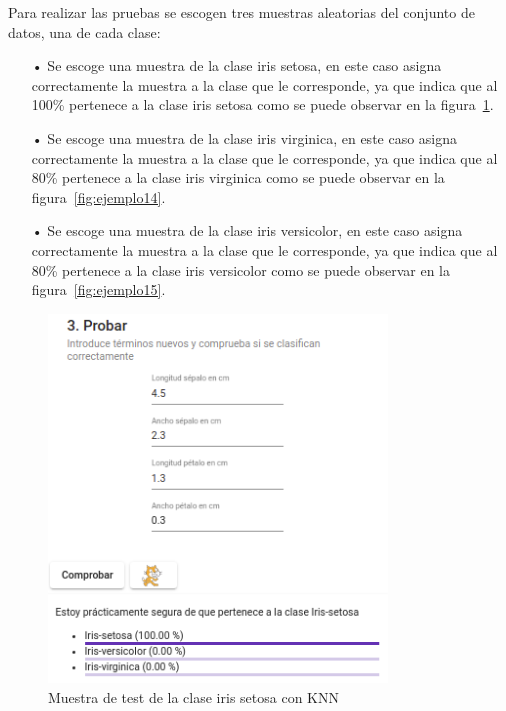 \documentclass[a4paper, 12pt]{book}
\begin{document}
Para realizar las pruebas se escogen tres muestras aleatorias del conjunto de datos, una de cada clase:

\begin{itemize}
\item[•] Se escoge una muestra de la clase iris setosa, en este caso asigna correctamente la muestra a la clase que le corresponde, ya que indica que al 100\% pertenece a la clase iris setosa como se puede observar en la figura~\ref{fig:ejemplo13}.

\item[•] Se escoge una muestra de la clase iris virginica, en este caso asigna correctamente la muestra a la clase que le corresponde, ya que indica que al 80\% pertenece a la clase iris virginica como se puede observar en la figura~\ref{fig:ejemplo14}.

\item[•] Se escoge una muestra de la clase iris versicolor, en este caso asigna correctamente la muestra a la clase que le corresponde, ya que indica que al 80\% pertenece a la clase iris versicolor como se puede observar en la figura~\ref{fig:ejemplo15}.
\end{itemize}

\begin{figure}
	\centering
	\includegraphics[width=9cm, keepaspectratio]{img/iris_set_num_knn.png}
	\caption{Muestra de test de la clase iris setosa con KNN} 	\label{fig:ejemplo13}
\end{figure}
\end{document}
